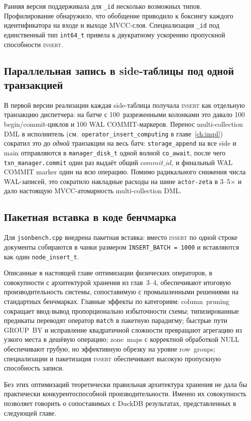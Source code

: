 Ранняя версия поддерживала для \texttt{\_id} несколько возможных
типов. Профилирование обнаружило, что обобщение приводило к боксингу
каждого идентификатора на входе и выходе MVCC-слоя. Специализация
\texttt{\_id} под единственный тип \texttt{int64\_t} привела к
двукратному ускорению пропускной способности \textsc{insert}.

\subsection{Параллельная запись в side-таблицы под одной транзакцией}

В первой версии реализации каждая side-таблица получала
\textsc{insert} как отдельную транзакцию диспетчера: на батче с
100~разреженными колонками это давало 100 begin/commit-циклов и
100 WAL COMMIT-маркеров. Перенос multi-collection DML в
исполнитель (см.~\texttt{operator\_insert\_computing} в
главе~\ref{ch:impl}) сократил это до \emph{одной} транзакции на
весь батч: \texttt{storage\_append} на все side и main отправляются
в \texttt{manager\_disk\_t} одной волной \texttt{co\_await}, после
чего \texttt{txn\_manager.commit} один раз выдаёт общий
$\mathit{commit\_id}$, и финальный WAL COMMIT marker один на всю
операцию. Помимо радикального снижения числа WAL-записей, это
сократило накладные расходы на шине \texttt{actor-zeta} в
3--5$\times$ и дало настоящую MVCC-атомарность multi-collection
DML.

\subsection{Пакетная вставка в коде бенчмарка}

Для \texttt{jsonbench.cpp} внедрена пакетная вставка: вместо
\textsc{insert} по одной строке документы собираются в чанки
размером \texttt{INSERT\_BATCH~=~1000} и вставляются как один
\texttt{node\_insert\_t}.

\chapterconclusion

Описанные в настоящей главе оптимизации физических операторов, в
совокупности с архитектурой хранения из глав~3--4, обеспечивают
итоговую производительность системы, сопоставимую с промышленными
решениями на стандартных бенчмарках. Главные эффекты по категориям:
column~pruning сокращает ввод-вывод пропорционально избыточности
схемы; типизированные предикаты переводят оператор \texttt{match} в
пакетную парадигму; быстрые пути GROUP~BY и исправление
квадратичной сложности превращают агрегацию из узкого места в
дешёвую операцию; zone~maps с корректной обработкой NULL
обеспечивают грубую, но эффективную обрезку на уровне row~groups;
специализации и пакетизация \textsc{insert} обеспечивают высокую
пропускную способность записи.

Без этих оптимизаций теоретически правильная архитектура хранения
не дала бы практически конкурентоспособной производительности.
Именно их совокупность позволяет говорить о сопоставимых с DuckDB
результатах, представленных в следующей главе.
